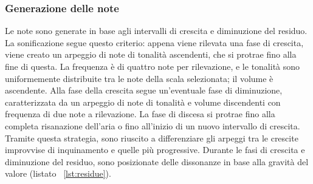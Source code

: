 \subsubsection{Generazione delle note}
Le note sono generate in base agli intervalli di crescita e diminuzione del residuo.
La sonificazione segue questo criterio: appena viene rilevata una fase di crescita, viene creato un arpeggio di note di tonalità ascendenti, che si protrae fino alla fine di questa.
La frequenza è di quattro note per rilevazione, e le tonalità sono uniformemente distribuite tra le note della scala selezionata; il volume è ascendente.
Alla fase della crescita segue un'eventuale fase di diminuzione, caratterizzata da un arpeggio di note di tonalità e volume discendenti con frequenza di due note a rilevazione. La fase
di discesa si protrae fino alla completa risanazione dell'aria o fino all'inizio di un nuovo intervallo di crescita.
Tramite questa strategia, sono riuscito a differenziare gli arpeggi tra le crescite improvvise di inquinamento e quelle più progressive.
Durante le fasi di crescita e diminuzione del residuo, sono posizionate delle dissonanze in base alla gravità del valore (listato ~\ref{lst:residue}).

\newpage

